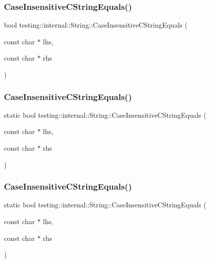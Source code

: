 \subsubsection{\texorpdfstring{CaseInsensitiveCStringEquals()}{CaseInsensitiveCStringEquals()}\hspace{0.1cm}{\footnotesize\ttfamily [1/3]}}
{\footnotesize\ttfamily bool testing\+::internal\+::\+String\+::\+Case\+Insensitive\+C\+String\+Equals (\begin{DoxyParamCaption}\item[{const char $\ast$}]{lhs,  }\item[{const char $\ast$}]{rhs }\end{DoxyParamCaption})\hspace{0.3cm}{\ttfamily [static]}}

\mbox{\label{classtesting_1_1internal_1_1_string_a7ce24c41c67b928fe89434d3571c988c}} 
\subsubsection{\texorpdfstring{CaseInsensitiveCStringEquals()}{CaseInsensitiveCStringEquals()}\hspace{0.1cm}{\footnotesize\ttfamily [2/3]}}
{\footnotesize\ttfamily static bool testing\+::internal\+::\+String\+::\+Case\+Insensitive\+C\+String\+Equals (\begin{DoxyParamCaption}\item[{const char $\ast$}]{lhs,  }\item[{const char $\ast$}]{rhs }\end{DoxyParamCaption})\hspace{0.3cm}{\ttfamily [static]}}

\mbox{\label{classtesting_1_1internal_1_1_string_a7ce24c41c67b928fe89434d3571c988c}} 
\subsubsection{\texorpdfstring{CaseInsensitiveCStringEquals()}{CaseInsensitiveCStringEquals()}\hspace{0.1cm}{\footnotesize\ttfamily [3/3]}}
{\footnotesize\ttfamily static bool testing\+::internal\+::\+String\+::\+Case\+Insensitive\+C\+String\+Equals (\begin{DoxyParamCaption}\item[{const char $\ast$}]{lhs,  }\item[{const char $\ast$}]{rhs }\end{DoxyParamCaption})\hspace{0.3cm}{\ttfamily [static]}}

